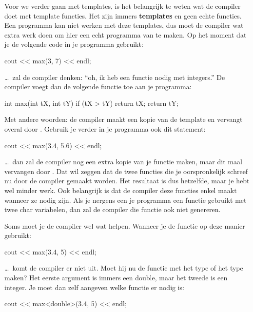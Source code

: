 \documentclass[11pt, oldfontcommands, oneside, a4paper]{memoir}
\begin{document}
Voor we verder gaan met templates, is het belangrijk te weten wat de compiler doet met template functies. Het zijn immers \textbf{templates} en geen echte functies. Een programma kan niet werken met deze templates, dus moet de compiler wat extra werk doen om hier een echt programma van te maken. Op het moment dat je de volgende code in je programma gebruikt:

\begin{code}
cout << max(3, 7) << endl;
\end{code}

\ldots\ zal de compiler denken: ``oh, ik heb een functie  nodig met integers.'' De compiler voegt dan de volgende functie toe aan je programma:

\begin{code}
int max(int tX, int tY) {
  if (tX > tY) return tX;
  return tY;
}
\end{code}

Met andere woorden: de compiler maakt een kopie van de template en vervangt  overal door . Gebruik je verder in je programma ook dit statement:

\begin{code}
cout << max(3.4, 5.6) << endl;
\end{code}

\ldots\ dan zal de compiler nog een extra kopie van je functie maken, maar dit maal  vervangen door . Dat wil zeggen dat de twee functies die je oorspronkelijk schreef nu door de compiler gemaakt worden. Het resultaat is dus hetzelfde, maar je hebt wel minder werk. Ook belangrijk is dat de compiler deze functies enkel maakt wanneer ze nodig zijn. Als je nergens een je programma een functie  gebruikt met twee char variabelen, dan zal de compiler die functie ook niet genereren.

Soms moet je de compiler wel wat helpen. Wanneer je de functie op deze manier gebruikt:

\begin{code}
cout << max(3.4, 5) << endl;
\end{code}

\ldots\ komt de compiler er niet uit. Moet hij nu de functie met het type  of het type  maken? Het eerste argument is immers een double, maar het tweede is een integer. Je moet dan zelf aangeven welke functie er nodig is:

\begin{code}
cout << max<double>(3.4, 5) << endl;
\end{code}
\end{document}

